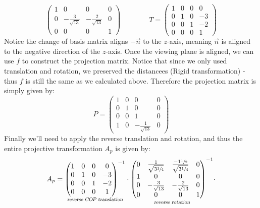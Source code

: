 \documentclass{article}
\begin{document}
\begin{enumerate}
$$\begin{pmatrix}
                1&0&0&0\\
                0&-\frac{3}{\sqrt{13}}&-\frac{2}{\sqrt{13}}&0\\
                0&0&0&1
            \end{pmatrix}\qquad\qquad
            T = \begin{pmatrix}
                1&0&0&0\\
                0&1&0&-3\\
                0&0&1&-2\\
                0&0&0&1
            \end{pmatrix}
        $$
        Notice the change of basis matrix aligns $-\vec{n}$ to the $z$-axis, meaning $\vec{n}$ is aligned to the negative direction of the $z$-axis. Once the viewing plane is aligned, we can use $f$ to construct the projection matrix. Notice that since we only used translation and rotation, we preserved the distancees (Rigid transformation) - thus $f$ is still the same as we calculated above. Therefore the projection matrix is simply given by:
        $$
        P = \begin{pmatrix}
            1&0&0&0\\
            0&1&0&0\\
            0&0&1&0\\
            1&0&-\frac{1}{\sqrt{13}}&0
        \end{pmatrix}
        $$
        Finally we'll need to apply the reverse translation and rotation, and thus the entire projective transformation $A_p$ is given by:
        $$
            A_p = \underset{\textsl{reverse COP translation}}{
                \begin{pmatrix}
                    1&0&0&0\\
                    0&1&0&-3\\
                    0&0&1&-2\\
                    0&0&0&1
                \end{pmatrix}^{-1}
            }\cdot
            \underset{\textsl{reverse rotation}}{\begin{pmatrix}
                0&\frac{1}{\sqrt{3\sfrac{1}{4}}}&\frac{-1\sfrac{1}{2}}{\sqrt{3\sfrac{1}{4}}}&0\\
                1&0&0&0\\
                0&-\frac{3}{\sqrt{13}}&-\frac{2}{\sqrt{13}}&0\\
                0&0&0&1
            \end{pmatrix}^{-1}}
            \cdot
$$
\end{enumerate}
\end{document}
